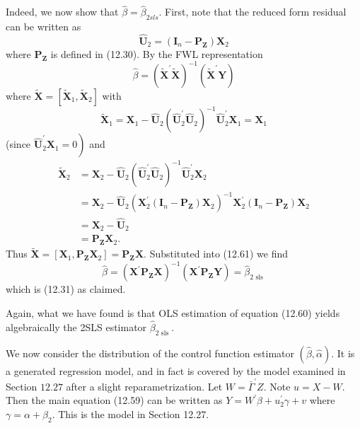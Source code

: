 \documentclass[10pt]{article}
\begin{document}
Indeed, we now show that $\widehat{\beta}=\widehat{\beta}_{2 s l s}$. First, note that the reduced form residual can be written as
$$
\widehat{\boldsymbol{U}}_{2}=\left(\boldsymbol{I}_{n}-\boldsymbol{P}_{\boldsymbol{Z}}\right) \boldsymbol{X}_{2}
$$
where $\boldsymbol{P}_{\boldsymbol{Z}}$ is defined in (12.30). By the FWL representation
$$
\widehat{\beta}=\left(\widetilde{\boldsymbol{X}}^{\prime} \widetilde{\boldsymbol{X}}\right)^{-1}\left(\widetilde{\boldsymbol{X}}^{\prime} \boldsymbol{Y}\right)
$$
where $\widetilde{\boldsymbol{X}}=\left[\widetilde{\boldsymbol{X}}_{1}, \widetilde{\boldsymbol{X}}_{2}\right]$ with
$$
\widetilde{\boldsymbol{X}}_{1}=\boldsymbol{X}_{1}-\widehat{\boldsymbol{U}}_{2}\left(\widehat{\boldsymbol{U}}_{2}^{\prime} \widehat{\boldsymbol{U}}_{2}\right)^{-1} \widehat{\boldsymbol{U}}_{2}^{\prime} \boldsymbol{X}_{1}=\boldsymbol{X}_{1}
$$
(since $\left.\widehat{\boldsymbol{U}}_{2}^{\prime} \boldsymbol{X}_{1}=0\right)$ and
$$
\begin{aligned}
\widetilde{\boldsymbol{X}}_{2} &=\boldsymbol{X}_{2}-\widehat{\boldsymbol{U}}_{2}\left(\widehat{\boldsymbol{U}}_{2}^{\prime} \widehat{\boldsymbol{U}}_{2}\right)^{-1} \widehat{\boldsymbol{U}}_{2}^{\prime} \boldsymbol{X}_{2} \\
&=\boldsymbol{X}_{2}-\widehat{\boldsymbol{U}}_{2}\left(\boldsymbol{X}_{2}^{\prime}\left(\boldsymbol{I}_{n}-\boldsymbol{P}_{\boldsymbol{Z}}\right) \boldsymbol{X}_{2}\right)^{-1} \boldsymbol{X}_{2}^{\prime}\left(\boldsymbol{I}_{n}-\boldsymbol{P}_{\boldsymbol{Z}}\right) \boldsymbol{X}_{2} \\
&=\boldsymbol{X}_{2}-\widehat{\boldsymbol{U}}_{2} \\
&=\boldsymbol{P}_{\boldsymbol{Z}} \boldsymbol{X}_{2} .
\end{aligned}
$$
Thus $\tilde{\boldsymbol{X}}=\left[\boldsymbol{X}_{1}, \boldsymbol{P}_{\boldsymbol{Z}} \boldsymbol{X}_{2}\right]=\boldsymbol{P}_{\boldsymbol{Z}} \boldsymbol{X}$. Substituted into (12.61) we find
$$
\widehat{\beta}=\left(\boldsymbol{X}^{\prime} \boldsymbol{P}_{\boldsymbol{Z}} \boldsymbol{X}\right)^{-1}\left(\boldsymbol{X}^{\prime} \boldsymbol{P}_{\boldsymbol{Z}} \boldsymbol{Y}\right)=\widehat{\beta}_{2 \text { sls }}
$$
which is (12.31) as claimed.

Again, what we have found is that OLS estimation of equation (12.60) yields algebraically the 2SLS estimator $\widehat{\beta}_{2 \text { sls }}$.

We now consider the distribution of the control function estimator $(\widehat{\beta}, \widehat{\alpha})$. It is a generated regression model, and in fact is covered by the model examined in Section $12.27$ after a slight reparametrization. Let $W=\bar{\Gamma}^{\prime} Z$. Note $u=X-W$. Then the main equation (12.59) can be written as $Y=W^{\prime} \beta+u_{2}^{\prime} \gamma+v$ where $\gamma=\alpha+\beta_{2}$. This is the model in Section 12.27.
\end{document}
